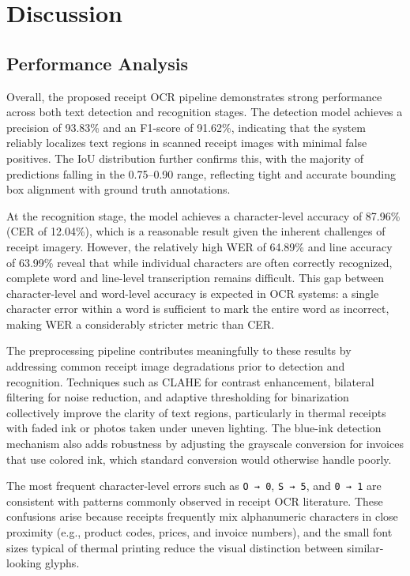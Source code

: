 \section{Discussion}

\subsection{Performance Analysis}

Overall, the proposed receipt OCR pipeline demonstrates strong performance across both text
detection and recognition stages. The detection model achieves a precision of 93.83\% and an
F1-score of 91.62\%, indicating that the system reliably localizes text regions in scanned
receipt images with minimal false positives. The IoU distribution further confirms this, with
the majority of predictions falling in the 0.75--0.90 range, reflecting tight and accurate
bounding box alignment with ground truth annotations.

At the recognition stage, the model achieves a character-level accuracy of 87.96\% (CER of
12.04\%), which is a reasonable result given the inherent challenges of receipt imagery.
However, the relatively high WER of 64.89\% and line accuracy of 63.99\% reveal that while
individual characters are often correctly recognized, complete word and line-level transcription
remains difficult. This gap between character-level and word-level accuracy is expected in OCR
systems: a single character error within a word is sufficient to mark the entire word as
incorrect, making WER a considerably stricter metric than CER.

The preprocessing pipeline contributes meaningfully to these results by addressing common
receipt image degradations prior to detection and recognition. Techniques such as CLAHE for
contrast enhancement, bilateral filtering for noise reduction, and adaptive thresholding for
binarization collectively improve the clarity of text regions, particularly in thermal receipts
with faded ink or photos taken under uneven lighting. The blue-ink detection mechanism also
adds robustness by adjusting the grayscale conversion for invoices that use colored ink, which
standard conversion would otherwise handle poorly.

The most frequent character-level errors such as \texttt{O → 0}, \texttt{S → 5}, and
\texttt{0 → 1} are consistent with patterns commonly observed in receipt OCR literature.
These confusions arise because receipts frequently mix alphanumeric characters in close
proximity (e.g., product codes, prices, and invoice numbers), and the small font sizes typical
of thermal printing reduce the visual distinction between similar-looking glyphs.

